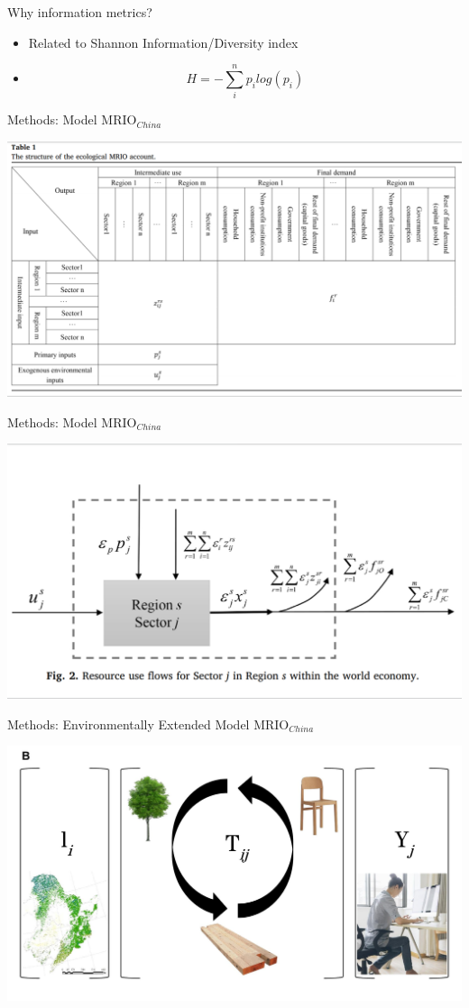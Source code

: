 \documentclass{beamer}
\begin{document}
\begin{frame}{Why information metrics?}

\begin{itemize}
\item
  Related to Shannon Information/Diversity index
\item
  \[H = -\sum_i^n p_i log(p_i)\]
\end{itemize}

\end{frame}

\begin{frame}{Methods: Model MRIO\(_{China}\)}

\begin{center}\includegraphics[width=0.5\linewidth]{images/Wu_2018_Table1} \end{center}

\end{frame}

\begin{frame}{Methods: Model MRIO\(_{China}\)}

\begin{center}\includegraphics[width=0.5\linewidth]{images/Wu_2018_Fig2} \end{center}

\end{frame}

\begin{frame}{Methods: Environmentally Extended Model MRIO\(_{China}\)}

\begin{center}\includegraphics[width=0.5\linewidth]{images/china_eemrio} \end{center}

\end{frame}
\end{document}
